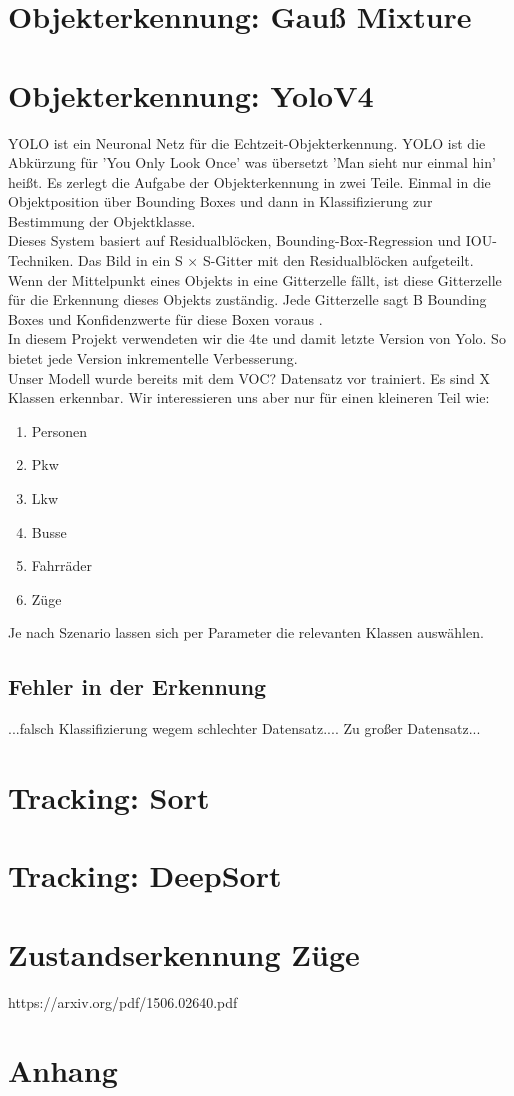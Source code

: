 \documentclass[conference]{IEEEtran}
\begin{document}
	\section{Objekterkennung: Gauß Mixture}
	
	\section{Objekterkennung: YoloV4}
	YOLO ist ein Neuronal Netz für die Echtzeit-Objekterkennung. YOLO ist die Abkürzung für 'You Only Look Once' was übersetzt 'Man sieht nur einmal hin' heißt. Es zerlegt die Aufgabe der Objekterkennung in zwei Teile. Einmal in die Objektposition über Bounding Boxes und dann in Klassifizierung zur Bestimmung der Objektklasse.\\
	Dieses System basiert auf Residualblöcken, Bounding-Box-Regression und IOU-Techniken.
	Das Bild in ein S × S-Gitter mit den Residualblöcken aufgeteilt. Wenn der Mittelpunkt eines Objekts in eine Gitterzelle fällt, ist diese Gitterzelle für die Erkennung dieses Objekts zuständig. Jede Gitterzelle sagt B Bounding Boxes und Konfidenzwerte für diese Boxen voraus \cite{b1}.\\
	In diesem Projekt verwendeten wir die 4te und damit letzte Version von Yolo. So bietet jede Version inkrementelle Verbesserung.\\
	Unser Modell wurde bereits mit dem VOC? Datensatz vor trainiert. Es sind X Klassen erkennbar. Wir interessieren uns aber nur für einen kleineren Teil wie:
	\begin{enumerate}
		\item Personen
		\item Pkw
		\item Lkw
		\item Busse
		\item Fahrräder
		\item Züge
	\end{enumerate}
	Je nach Szenario lassen sich per Parameter die relevanten Klassen auswählen.
	
	\subsection{Fehler in der Erkennung}
	...falsch Klassifizierung wegem schlechter Datensatz....
	Zu großer Datensatz...

	\section{Tracking: Sort}
	
	\section{Tracking: DeepSort}
	
	\section{Zustandserkennung Züge}
	
	\begin{thebibliography}{00}
		https://arxiv.org/pdf/1506.02640.pdf
	\end{thebibliography}
	
	
	
	\section{Anhang}
	
\end{document}
